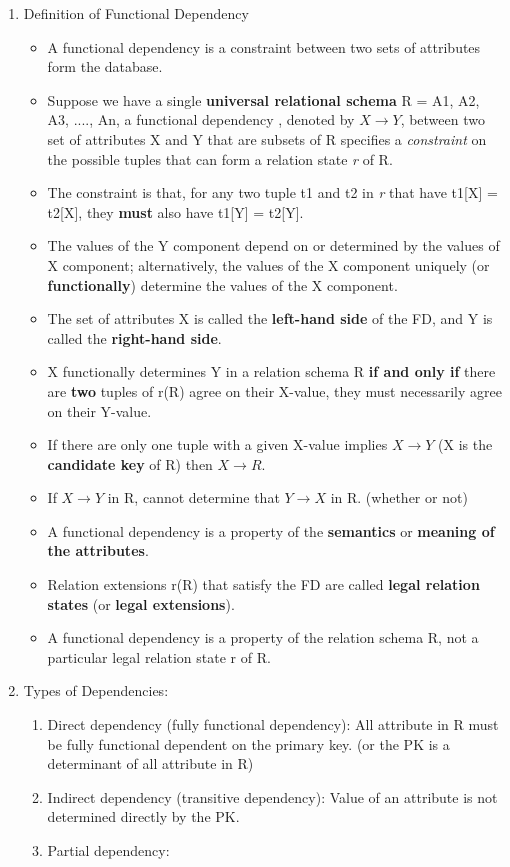 \documentclass[10pt]{article}
\newcommand{\tf}{\textbf}
\newcommand{\ti}{\textit}
\newcommand{\rarrow}{\rightarrow}
\begin{document}
\begin{enumerate}
	\item Definition of Functional Dependency 
	
	\begin{itemize}
		\item A functional dependency is a constraint between two sets of attributes form the database.
		\item Suppose we have a single \tf{universal relational schema} R = {A1, A2, A3, ...., An}, a functional dependency , denoted by $X \rarrow Y$, between two set of attributes X and Y that are subsets of R specifies a \ti{constraint} on the possible tuples that can form a relation state \ti{r} of R.
		\item The constraint is that, for any two tuple t1 and t2 in \ti{r} that have t1[X] = t2[X], they \tf{must} also have t1[Y] = t2[Y].
		\item The values of the Y component depend on or determined by the values of X component; alternatively, the values of the X component uniquely (or \tf{functionally}) determine the values of the X component.
		\item The set of attributes X is called the \tf{left-hand side} of the FD, and Y is called the \tf{right-hand side}.
		\item X functionally determines Y in a relation schema R \tf{if and only if} there are \tf{two} tuples of r(R) agree on their X-value, they must necessarily agree on their Y-value.
		\item If there are only one tuple with a given X-value implies $X \rarrow Y$ (X is the \tf{candidate key} of R) then $X \rarrow R$.
		\item If $X \rarrow Y$ in R, cannot determine that $Y \rarrow X$ in R. (whether or not)
		\item A functional dependency is a property of the \tf{semantics} or \tf{meaning of the attributes}.
		\item Relation extensions r(R) that satisfy the FD are called \tf{legal relation states} (or \tf{legal extensions}).
		\item A functional dependency is a property of the relation schema R, not a particular legal relation state r of R.
	\end{itemize}

	\item Types of Dependencies:
	
	\begin{enumerate}
		\item Direct dependency (fully functional dependency): All attribute in R must be fully functional dependent on the primary key. (or the PK is a determinant of all attribute in R)
		\item Indirect dependency (transitive dependency): Value of an attribute is not determined directly by the PK.
		\item Partial dependency:
		

\end{enumerate}
\end{enumerate}
\end{document}
